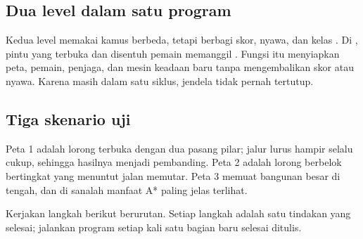 \subsection*{Dua level dalam satu program}

Kedua level memakai kamus berbeda, tetapi berbagi skor, nyawa, dan kelas
. Di , pintu yang terbuka dan disentuh pemain
memanggil . Fungsi itu menyiapkan peta, pemain, penjaga,
dan mesin keadaan baru tanpa mengembalikan skor atau nyawa. Karena masih
dalam satu siklus, jendela tidak pernah tertutup.

\subsection*{Tiga skenario uji}

Peta 1 adalah lorong terbuka dengan dua pasang pilar; jalur lurus hampir
selalu cukup, sehingga hasilnya menjadi pembanding. Peta 2 adalah lorong
berbelok bertingkat yang menuntut jalan memutar. Peta 3 memuat bangunan
besar di tengah, dan di sanalah manfaat A* paling jelas terlihat.


Kerjakan langkah berikut berurutan. Setiap langkah adalah satu tindakan yang
selesai; jalankan program setiap kali satu bagian baru selesai ditulis.

